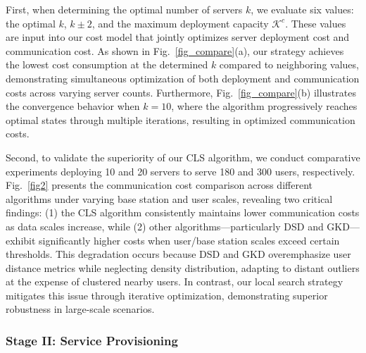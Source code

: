 \documentclass[10pt, conference, letterpaper]{IEEEtran}
\begin{document}
First, when determining the optimal number of servers $k$, we evaluate six values: the optimal $k$, $k \pm 2$, and the maximum deployment capacity $\mathcal{K}^c$. These values are input into our cost model that jointly optimizes server deployment cost and communication cost. As shown in Fig.~\ref{fig_compare}(a), our strategy achieves the lowest cost consumption at the determined $k$ compared to neighboring values, demonstrating simultaneous optimization of both deployment and communication costs across varying server counts. Furthermore, Fig.~\ref{fig_compare}(b) illustrates the convergence behavior when $k=10$, where the algorithm progressively reaches optimal states through multiple iterations, resulting in optimized communication costs.

Second, to validate the superiority of our CLS algorithm, we conduct comparative experiments deploying 10 and 20 servers to serve 180 and 300 users, respectively. Fig.~\ref{fig2} presents the communication cost comparison across different algorithms under varying base station and user scales, revealing two critical findings: (1) the CLS algorithm consistently maintains lower communication costs as data scales increase, while (2) other algorithms—particularly DSD and GKD—exhibit significantly higher costs when user/base station scales exceed certain thresholds. This degradation occurs because DSD and GKD overemphasize user distance metrics while neglecting density distribution, adapting to distant outliers at the expense of clustered nearby users. In contrast, our local search strategy mitigates this issue through iterative optimization, demonstrating superior robustness in large-scale scenarios.

\subsubsection{Stage II: Service Provisioning}
\end{document}
